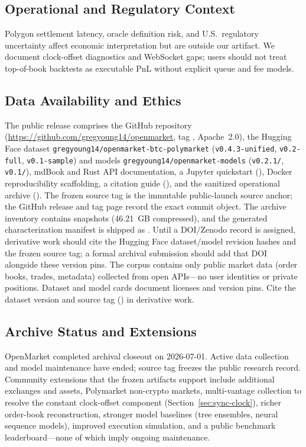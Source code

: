 \subsection{Operational and Regulatory Context}

Polygon settlement latency, oracle definition risk, and U.S.\ regulatory
uncertainty affect economic interpretation but are outside our artifact. We
document clock-offset diagnostics and WebSocket gaps; users should not treat
top-of-book backtests as executable PnL without explicit queue and fee models.

\subsection{Data Availability and Ethics}
\label{sec:release}

The public release comprises the GitHub repository
(\url{https://github.com/gregyoung14/openmarket}, tag \OpenMarketReleaseTag{},
Apache~2.0), the Hugging Face dataset
\texttt{gregyoung14/openmarket-btc-polymarket} (\texttt{v0.4.3-unified},
\texttt{v0.2-full}, \texttt{v0.1-sample}) and models
\texttt{gregyoung14/openmarket-models} (\texttt{v0.2.1/}, \texttt{v0.1/}),
mdBook and Rust API documentation, a Jupyter quickstart
(), Docker reproducibility scaffolding, a
citation guide (), and the sanitized operational archive
().
The frozen source tag \OpenMarketReleaseTag{} is the immutable public-launch
source anchor; the GitHub release and tag page record the exact commit object.
The archive inventory contains \OpenMarketSnapshots{} snapshots
(46.21~GB compressed), and the generated characterization manifest is shipped
as . Until a DOI/Zenodo record
is assigned, derivative work should cite the Hugging Face dataset/model
revision hashes and the frozen source tag; a formal archival submission should
add that DOI alongside these version pins.
The corpus contains only public market data (order books, trades,
metadata) collected from open APIs---no user identities or private positions.
Dataset and model cards document licenses and version pins. Cite the dataset
version and source tag (\OpenMarketReleaseTag{}) in derivative work.

\subsection{Archive Status and Extensions}
\label{sec:future-work}

OpenMarket completed archival closeout on 2026-07-01. Active data collection
and model maintenance have ended; source tag \OpenMarketReleaseTag{} freezes
the public research record. Community extensions that the frozen artifacts
support include additional exchanges and assets, Polymarket non-crypto
markets, multi-vantage collection to resolve the constant clock-offset
component (Section~\ref{sec:sync-clock}), richer order-book reconstruction,
stronger model baselines (tree ensembles, neural sequence models), improved
execution simulation, and a public benchmark leaderboard---none of which
imply ongoing maintenance.
